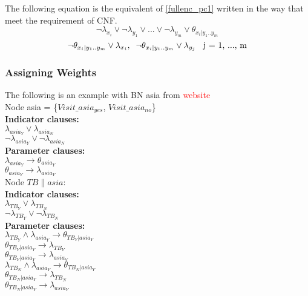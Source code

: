 The following equation is the equivalent of \ref{fullenc_pc1} written in the way that meet the requirement of CNF.
\begin{equation}\label{fullenc_IP}
    \neg\lambda_{x_{i}} \vee \neg\lambda_{y_{1}} \vee... \vee \neg\lambda_{y_{m}} \vee \theta_{x_{i}|y_{1}..y_{m}}
\end{equation}
\begin{equation}\label{fullenc_PI}
    \neg\theta_{x_{i}|y_{1}..y_{m}} \vee \lambda_{x_{i}},\\ \;\;
    \neg\theta_{x_{i}|y_{1}..y_{m}} \vee \lambda_{y_{j}} \;\; \mbox{ j = 1, ..., m}
\end{equation}


\subsubsection{Assigning Weights}

The following is an example with BN asia from \textcolor{red}{website}\\
Node asia = \{$Visit\_asia_{yes}$, $Visit\_asia_{no}$\}\\
\textbf{Indicator clauses:}\\
$\lambda_{asia_{Y}} \vee \lambda_{asia_{N}}$\\
$\neg \lambda_{asia_{Y}} \vee \neg\lambda_{asia_{N}}$\\
\newline
\textbf{Parameter clauses:}\\
$\lambda_{asia_{Y}} \rightarrow \theta_{asia_{Y}}$\\
$\theta_{asia_{Y}} \rightarrow \lambda_{asia_{Y}}$\\
\newline
Node $TB\|asia$:\\
\textbf{Indicator clauses:}\\
$\lambda_{TB_{Y}} \vee \lambda_{TB_{N}}$\\
$\neg \lambda_{TB_{Y}} \vee \neg\lambda_{TB_{N}}$\\
\newline
\textbf{Parameter clauses:}\\
$\lambda_{TB_{Y}} \wedge \lambda_{asia_{Y}}\rightarrow \theta_{TB_{Y}|asia_{Y}}$\\
$\theta_{TB_{Y}|asia_{Y}} \rightarrow \lambda_{TB_{Y}}$\\
$\theta_{TB_{Y}|asia_{Y}} \rightarrow \lambda_{asia_{Y}}$\\
\newline
$\lambda_{TB_{N}} \wedge \lambda_{asia_{Y}} \rightarrow \theta_{TB_{N}|asia_{Y}}$\\
$\theta_{TB_{N}|asia_{Y}} \rightarrow \lambda_{TB_{N}}$\\
$\theta_{TB_{N}|asia_{Y}} \rightarrow \lambda_{asia_{Y}}$\\
